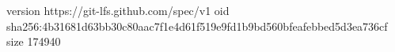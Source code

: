 version https://git-lfs.github.com/spec/v1
oid sha256:4b31681d63bb30c80aac7f1e4d61f519e9fd1b9bd560bfeafebbed5d3ea736cf
size 174940
